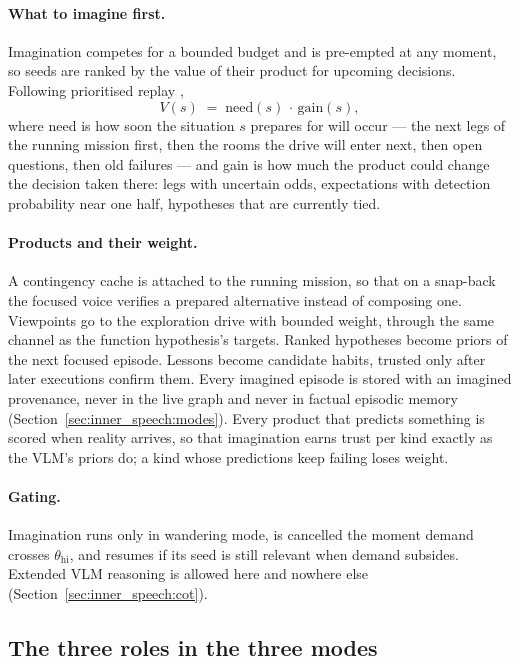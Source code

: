 \paragraph{What to imagine first.}
Imagination competes for a bounded budget and is pre-empted at any moment, so seeds are ranked by the value of their
product for upcoming decisions. Following prioritised replay \cite{mattar2018prioritized},
\begin{equation}
    V(s) \;=\; \mathrm{need}(s)\,\cdot\,\mathrm{gain}(s),
    \label{eq:lh_priority}
\end{equation}
where need is how soon the situation $s$ prepares for will occur --- the next legs of the running mission first, then
the rooms the drive will enter next, then open questions, then old failures --- and gain is how much the product could
change the decision taken there: legs with uncertain odds, expectations with detection probability near one half,
hypotheses that are currently tied.

\paragraph{Products and their weight.}
A contingency cache is attached to the running mission, so that on a snap-back the focused voice verifies a prepared
alternative instead of composing one. Viewpoints go to the exploration drive with bounded weight, through the same
channel as the function hypothesis's targets. Ranked hypotheses become priors of the next focused episode. Lessons
become candidate habits, trusted only after later executions confirm them. Every imagined episode is stored with an
imagined provenance, never in the live graph and never in factual episodic memory (Section~\ref{sec:inner_speech:modes}).
Every product that predicts something is scored when reality arrives, so that imagination earns trust per kind
exactly as the VLM's priors do; a kind whose predictions keep failing loses weight.

\paragraph{Gating.}
Imagination runs only in wandering mode, is cancelled the moment demand crosses $\theta_{\text{hi}}$, and resumes if
its seed is still relevant when demand subsides. Extended VLM reasoning is allowed here and nowhere else
(Section~\ref{sec:inner_speech:cot}).

\subsection{The three roles in the three modes}
\label{sec:lang_hierarchy:modes}

